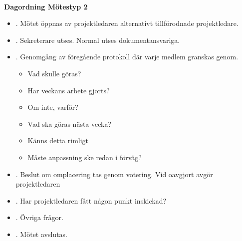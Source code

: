 \documentclass[titlepage, a4paper]{article}
\begin{document}
{\ }\vspace{5mm}

\begin{center}
  \textbf{\Huge Dagordning Mötestyp 2}
\end{center}

\vspace{10mm}

\begin{itemize}
\item{. Mötet öppnas av projektledaren alternativt tillförodnade projektledare.}
\item{. Sekreterare utses. Normal utses dokumentansvariga.}
\item{. Genomgång av föregående protokoll där varje medlem granskas genom.
\begin{itemize}
\item{Vad skulle göras?}
\item{Har veckans arbete gjorts?}
\item{Om inte, varför?}
\item{Vad ska göras nästa vecka?}
\item{Känns detta rimligt}
\item{Måste anpassning ske redan i förväg?}
\end{itemize}
}
\item{. Beslut om omplacering tas genom votering. Vid oavgjort avgör projektledaren}
\item{. Har projektledaren fått någon punkt inskickad?}
\item{. Övriga frågor.}
\item{. Mötet avslutas.}
\end{itemize}
\end{document}
